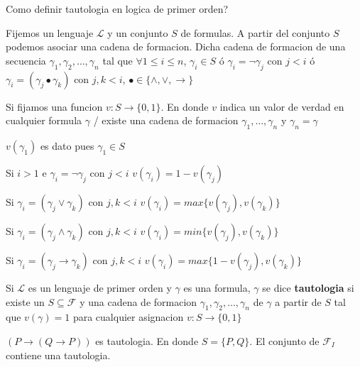 \textquestiondown Como definir tautologia en logica de primer orden?

Fijemos un lenguaje $\mathcal{L}$ y un conjunto $S$ de formulas. A partir del conjunto $S$ podemos asociar una cadena de formacion. Dicha cadena de formacion de una secuencia $\gamma_1, \gamma_2, \ldots, \gamma_n$ tal que $\forall 1 \leq i \leq n$, $\gamma_i \in S$ \'o $\gamma_i = \neg \gamma_j $ con $j < i$ \'o $\gamma_i = (\gamma_j \bullet \gamma_k)$ con $j, k < i$, $\bullet \in \{ \land, \lor, \rightarrow\}$

Si fijamos una funcion $v \colon S \rightarrow \{0, 1\}$. En donde $v$ indica un valor de verdad en cualquier formula $\gamma$ / existe una cadena de formacion $\gamma_1, \ldots, \gamma_n$ y $\gamma_n = \gamma$

$v(\gamma_1)$ es dato pues $\gamma_1 \in S$

Si $i > 1$ e $\gamma_i = \neg \gamma_j$ con $j < i$ $v(\gamma_i) = 1 - v(\gamma_j)$

Si $\gamma_i = (\gamma_j \lor \gamma_k)$ con $j, k < i$ $v(\gamma_i) = max \{ v(\gamma_j), v(\gamma_k) \}$

Si $\gamma_i = (\gamma_j \land \gamma_k)$ con $j, k < i$ $v(\gamma_i) = min \{ v(\gamma_j), v(\gamma_k) \}$

Si $\gamma_i = (\gamma_j \rightarrow \gamma_k)$ con $j, k < i$ $v(\gamma_i) = max \{1 - v(\gamma_j), v(\gamma_k) \}$

\begin{definition}

Si $\mathcal{L}$  es un lenguaje de primer orden y $\gamma$ es una formula, $\gamma$ se dice \textbf{tautologia} si existe un $S \subseteq \mathcal{F}$ y una cadena de formacion $\gamma_1, \gamma_2, \ldots, \gamma_n$ de $\gamma$ a partir de $S$ tal que $v(\gamma) = 1$ para cualquier asignacion $v \colon S \rightarrow \{0, 1 \}$

\begin{example}
$(P \rightarrow (Q \rightarrow P))$ es tautologia. En donde $S = \{ P, Q\}$. El conjunto de $\mathcal{F}_{I}$ contiene una tautologia.
\end{example}

\end{definition}

